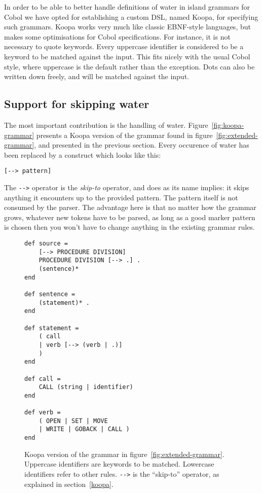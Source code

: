 \documentclass[a4paper]{article}
\begin{document}
In order to be able to better handle definitions of water in island grammars for Cobol we have opted for establishing a custom DSL, named Koopa, for specifying such grammars. Koopa works very much like classic EBNF-style languages, but makes some optimisations for Cobol specifications. For instance, it is not necessary to quote keywords. Every uppercase identifier is considered to be a keyword to be matched against the input. This fits nicely with the usual Cobol style, where uppercase is the default rather than the exception. Dots can also be written down freely, and will be matched against the input.


\subsection{Support for skipping water}

The most important contribution is the handling of water. Figure~\ref{fig:koopa-grammar} presents a Koopa version of the grammar found in figure~\ref{fig:extended-grammar}, and presented in the previous section. Every occurence of water has been replaced by a construct which looks like this:
\begin{lstlisting}[numbers=none]
  [--> pattern]
\end{lstlisting}
The \lstinline|-->| operator is the \emph{skip-to} operator, and does as its name implies: it skips anything it encounters up to the provided pattern. The pattern itself is not consumed by the parser. The advantage here is that no matter how the grammar grows, whatever new tokens have to be parsed, as long as a good marker pattern is chosen then you won't have to change anything in the existing grammar rules.

\begin{figure}
\centering
\begin{lstlisting}
def source =
    [--> PROCEDURE DIVISION]
    PROCEDURE DIVISION [--> .] .
    (sentence)*
end

def sentence =
    (statement)* .
end

def statement =
    ( call
    | verb [--> (verb | .)]
    )
end

def call = 
    CALL (string | identifier)
end

def verb =
    ( OPEN | SET | MOVE
    | WRITE | GOBACK | CALL )
end
\end{lstlisting}
\caption{Koopa version of the grammar in figure~\ref{fig:extended-grammar}. Uppercase identifiers are keywords to be matched. Lowercase identifiers refer to other rules. \lstinline|-->| is the ``skip-to'' operator, as explained in section~\ref{koopa}.}
\end{figure}
\end{document}
